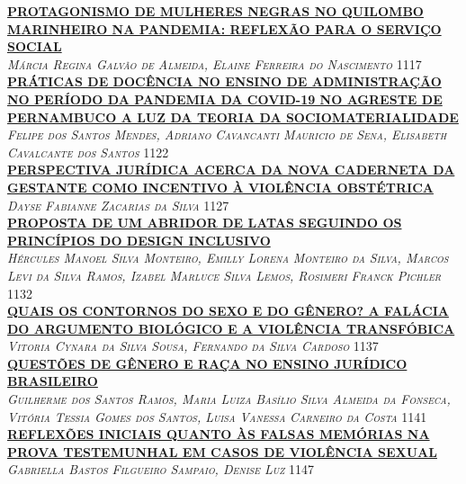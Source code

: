 \noindent \textsc{\hyperlink{trabalhos/250151.pdf.1}{\textbf{PROTAGONISMO DE MULHERES NEGRAS NO QUILOMBO MARINHEIRO NA PANDEMIA: REFLEXÃO PARA O SERVIÇO SOCIAL}}}\\ 
\noindent \textsc{\textit{Márcia Regina Galvão de Almeida, Elaine Ferreira do Nascimento}} \hfill 1117\\ 

\noindent \textsc{\hyperlink{trabalhos/249379.pdf.1}{\textbf{PRÁTICAS DE DOCÊNCIA NO ENSINO DE ADMINISTRAÇÃO NO PERÍODO DA PANDEMIA DA COVID-19 NO AGRESTE DE PERNAMBUCO A LUZ DA TEORIA DA SOCIOMATERIALIDADE}}}\\ 
\noindent \textsc{\textit{Felipe dos Santos Mendes, Adriano Cavancanti Mauricio de Sena, Elisabeth Cavalcante dos Santos}} \hfill 1122\\ 

\noindent \textsc{\hyperlink{trabalhos/247597.pdf.1}{\textbf{PERSPECTIVA JURÍDICA ACERCA DA NOVA CADERNETA DA GESTANTE COMO INCENTIVO À VIOLÊNCIA OBSTÉTRICA}}}\\ 
\noindent \textsc{\textit{Dayse Fabianne Zacarias da Silva}} \hfill 1127\\ 

\noindent \textsc{\hyperlink{trabalhos/242791.pdf.1}{\textbf{PROPOSTA DE UM ABRIDOR DE LATAS SEGUINDO OS PRINCÍPIOS DO DESIGN INCLUSIVO}}}\\ 
\noindent \textsc{\textit{Hércules Manoel Silva Monteiro, Emilly Lorena Monteiro da Silva, Marcos Levi da Silva Ramos, Izabel Marluce Silva Lemos, Rosimeri Franck Pichler}} \hfill 1132\\ 

\noindent \textsc{\hyperlink{trabalhos/249343.pdf.1}{\textbf{QUAIS OS CONTORNOS DO SEXO E DO GÊNERO? A FALÁCIA DO ARGUMENTO BIOLÓGICO E A VIOLÊNCIA TRANSFÓBICA}}}\\ 
\noindent \textsc{\textit{Vitoria Cynara da Silva Sousa, Fernando da Silva Cardoso}} \hfill 1137\\ 

\noindent \textsc{\hyperlink{trabalhos/251813.pdf.1}{\textbf{QUESTÕES DE GÊNERO E RAÇA NO ENSINO JURÍDICO BRASILEIRO}}}\\ 
\noindent \textsc{\textit{Guilherme dos Santos Ramos, Maria Luiza Basílio Silva Almeida da Fonseca, Vitória Tessia Gomes dos Santos, Luisa Vanessa Carneiro da Costa}} \hfill 1141\\ 

\noindent \textsc{\hyperlink{trabalhos/251627.pdf.1}{\textbf{REFLEXÕES INICIAIS QUANTO ÀS FALSAS MEMÓRIAS NA PROVA TESTEMUNHAL EM CASOS DE VIOLÊNCIA SEXUAL}}}\\ 
\noindent \textsc{\textit{Gabriella Bastos Filgueiro Sampaio, Denise Luz}} \hfill 1147\\ 

